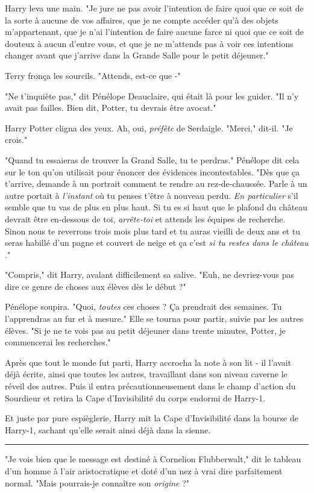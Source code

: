 Harry leva une main. "Je jure ne pas avoir l'intention de faire quoi que ce soit de la sorte à aucune de vos affaires, que je ne compte accéder qu'à des objets m'appartenant, que je n'ai l'intention de faire aucune farce ni quoi que ce soit de douteux à aucun d'entre vous, et que je ne m'attends pas à voir ces intentions changer avant que j'arrive dans la Grande Salle pour le petit déjeuner."

Terry fronça les sourcils. "Attends, est-ce que -"

"Ne t'inquiète pas," dit Pénélope Deauclaire, qui était là pour les guider. "Il n'y avait pas failles. Bien dit, Potter, tu devrais être avocat."

Harry Potter cligna des yeux. Ah, oui, \emph{préfète } de Serdaigle. "Merci," dit-il. "Je crois."

"Quand tu essaieras de trouver la Grand Salle, tu te perdras." Pénélope dit cela sur le ton qu'on utilisait pour énoncer des évidences incontestables. "Dès que ça t'arrive, demande à un portrait comment te rendre au rez-de-chaussée. Parle à un autre portait à \emph{l'instant}  où tu penses t'être à nouveau perdu. \emph{En particulier}  s'il semble que tu vas de plus en plus haut. Si tu es si haut que le plafond du château devrait être en-dessous de toi, \emph{arrête-toi}  et attends les équipes de recherche. Sinon nous te reverrons trois mois plus tard et tu auras vieilli de deux ans et tu seras habillé d'un pagne et couvert de neige et ça c'est \emph{si tu restes dans le château} ."

"Compris," dit Harry, avalant difficilement sa salive. "Euh, ne devriez-vous pas dire ce genre de choses aux élèves dès le début ?"

Pénélope soupira. "Quoi, \emph{toutes}  ces choses ? Ça prendrait des semaines. Tu l'apprendras au fur et à mesure." Elle se tourna pour partir, suivie par les autres élèves. "Si je ne te vois pas au petit déjeuner dans trente minutes, Potter, je commencerai les recherches."

Après que tout le monde fut parti, Harry accrocha la note à son lit - il l'avait déjà écrite, ainsi que toutes les autres, travaillant dans son niveau caverne le réveil des autres. Puis il entra précautionneusement dans le champ d'action du Sourdieur et retira la Cape d'Invisibilité du corps endormi de Harry-1.

Et juste par pure espièglerie, Harry mit la Cape d'Invisibilité dans la bourse de Harry-1, sachant qu'elle serait ainsi déjà dans la sienne.
\par\noindent\rule{\textwidth}{0.4pt}
"Je vois bien que le message est destiné à Cornelion Flubberwalt," dit le tableau d'un homme à l'air aristocratique et doté d'un nez à vrai dire parfaitement normal. "Mais pourrais-je connaître son \emph{origine}  ?"

